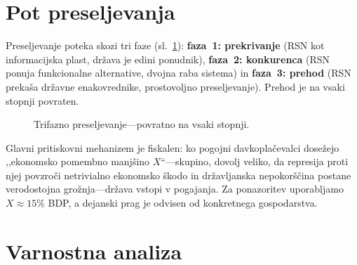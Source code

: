 \documentclass[11pt,a4paper,twocolumn]{article}
\begin{document}
\section{Pot preseljevanja}

Preseljevanje poteka skozi tri faze (sl.~\ref{fig:migration}): \textbf{faza~1: prekrivanje} (RSN kot informacijska plast, država je edini ponudnik), \textbf{faza~2: konkurenca} (RSN ponuja funkcionalne alternative, dvojna raba sistema) in \textbf{faza~3: prehod} (RSN prekaša državne enakovrednike, prostovoljno preseljevanje). Prehod je na vsaki stopnji povraten.

\begin{figure}[ht]
\centering
{}
\caption{Trifazno preseljevanje---povratno na vsaki stopnji.}
\label{fig:migration}
\end{figure}

Glavni pritiskovni mehanizem je fiskalen: ko pogojni davkoplačevalci dosežejo ,,ekonomsko pomembno manjšino $X$``---skupino, dovolj veliko, da represija proti njej povzroči netrivialno ekonomsko škodo in državljanska nepokorščina postane verodostojna grožnja---država vstopi v pogajanja. Za ponazoritev uporabljamo $X \approx 15\%$ BDP, a dejanski prag je odvisen od konkretnega gospodarstva.

\section{Varnostna analiza}
\end{document}
